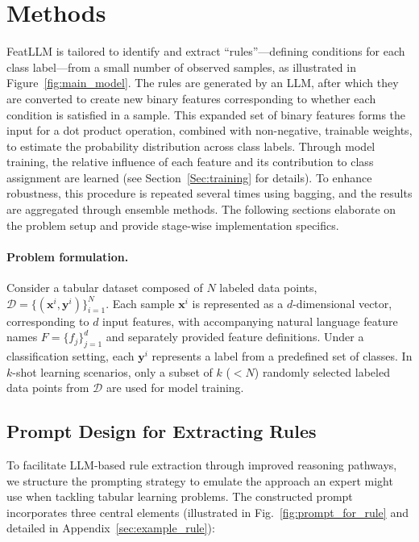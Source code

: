 \section{Methods}
\textsf{FeatLLM} is tailored to identify and extract ``rules''—defining conditions for each class label—from a small number of observed samples, as illustrated in Figure~\ref{fig:main_model}. The rules are generated by an LLM, after which they are converted to create new binary features corresponding to whether each condition is satisfied in a sample. This expanded set of binary features forms the input for a dot product operation, combined with non-negative, trainable weights, to estimate the probability distribution across class labels. Through model training, the relative influence of each feature and its contribution to class assignment are learned (see Section~\ref{Sec:training} for details). To enhance robustness, this procedure is repeated several times using bagging, and the results are aggregated through ensemble methods. The following sections elaborate on the problem setup and provide stage-wise implementation specifics.

\vspace*{-0.12in}
\paragraph{Problem formulation.} Consider a tabular dataset composed of $N$ labeled data points, $\mathcal{D} = \{(\mathbf{x}^i, \mathbf{y}^i)\}_{i=1}^{N}$. Each sample $\mathbf{x}^i$ is represented as a $d$-dimensional vector, corresponding to $d$ input features, with accompanying natural language feature names $F = \{f_j\}_{j=1}^{d}$ and separately provided feature definitions. Under a classification setting, each $\mathbf{y}^i$ represents a label from a predefined set of classes. In $k$-shot learning scenarios, only a subset of $k$ ($<N$) randomly selected labeled data points from $\mathcal{D}$ are used for model training.

\subsection{Prompt Design for Extracting Rules}
\label{Sec:prompt_design}
To facilitate LLM-based rule extraction through improved reasoning pathways, we structure the prompting strategy to emulate the approach an expert might use when tackling tabular learning problems. The constructed prompt incorporates three central elements (illustrated in Fig.~\ref{fig:prompt_for_rule} and detailed in Appendix~\ref{sec:example_rule}):

